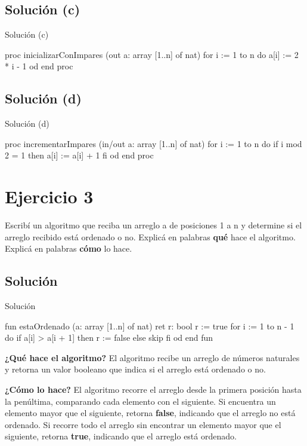 \subsection{Solución (c)}
\begin{codebox}{Solución (c)}
\begin{pascallike}
proc inicializarConImpares (out a: array [1..n] of nat)
    for i := 1 to n do
    a[i] := 2 * i - 1
    od
end proc
\end{pascallike}
\end{codebox}

\subsection{Solución (d)}
\begin{codebox}{Solución (d)}
\begin{pascallike}
proc incrementarImpares (in/out a: array [1..n] of nat)
    for i := 1 to n do
    if i mod 2 = 1 then
        a[i] := a[i] + 1
    fi
    od
end proc
\end{pascallike}
\end{codebox}

\section{Ejercicio 3}
Escribí un algoritmo que reciba un arreglo a de posiciones 1 a n y determine si el arreglo recibido está ordenado o no. Explicá en palabras \textbf{qué} hace el algoritmo. Explicá en palabras \textbf{cómo} lo hace.

\subsection{Solución}
\begin{codebox}{Solución}
\begin{pascallike}
fun estaOrdenado (a: array [1..n] of nat) ret r: bool
    r := true
    for i := 1 to n - 1 do
    if a[i] > a[i + 1] then
        r := false
    else
        skip
    fi
    od
end fun
\end{pascallike}
\end{codebox}

\textbf{¿Qué hace el algoritmo?} El algoritmo recibe un arreglo de números naturales y retorna un valor booleano que indica si el arreglo está ordenado o no.

\textbf{¿Cómo lo hace?} El algoritmo recorre el arreglo desde la primera posición hasta la penúltima, comparando cada elemento con el siguiente. Si encuentra un elemento mayor que el siguiente, retorna \textbf{false}, indicando que el arreglo no está ordenado. Si recorre todo el arreglo sin encontrar un elemento mayor que el siguiente, retorna \textbf{true}, indicando que el arreglo está ordenado.

